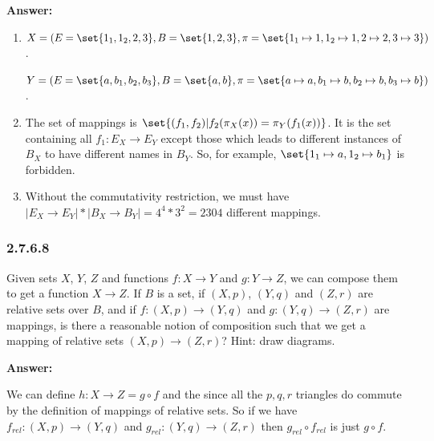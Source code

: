 \documentclass{article}
\newcommand{\vsp}[0]{\vspace*{10pt}\par}
\newcommand{\exercise}[1]{\subsubsection*{#1}}
\newcommand{\ans}[0]{\vsp\textbf{Answer: }\vsp}
\newcommand{\ei}{\item}
\newcommand{\es}{\begin{enumerate}[label=(\alph*)]\ei}
\newcommand{\ee}{\end{enumerate}}
\begin{document}
\ans

\es $X = (E =
    \set{1_1,1_2,2,3}, B = \set{1, 2, 3}, \pi = \set{1_1 \mapsto 1, 1_2
    \mapsto 1, 2 \mapsto 2, 3 \mapsto 3})$.

    $Y = (E = \set{a, b_1, b_2, b_3}, B = \set{a,b}, \pi = \set{a \mapsto a, b_1
    \mapsto b, b_2 \mapsto b, b_3 \mapsto b})$.
\ei The set of mappings is $\set{(f_1, f_2) | f_2(\pi_X(x)) =
    \pi_Y(f_1(x))}$. It is the set containing all $f_1: E_X \to E_Y$ except
    those which leads to different instances of $B_X$ to have different names in
    $B_Y$. So, for example, $\set{1_1 \mapsto a, 1_2 \mapsto b_1}$ is forbidden.
\ei Without the commutativity restriction, we must have $|E_X \to E_Y| * |B_X
    \to B_Y| = 4^4 * 3^2 = 2304$ different mappings.
\ee

\exercise{2.7.6.8}

Given sets $X$, $Y$, $Z$ and functions $f : X \to Y$ and $g: Y \to Z$, we can
compose them to get a function $X \to Z$. If $B$ is a set, if $(X, p)$, $(Y,
q)$ and $(Z, r)$ are relative sets over $B$, and if $f : (X, p) \to (Y, q)$ and
$g: (Y, q) \to (Z, r)$ are mappings, is there a reasonable notion of composition
such that we get a mapping of relative sets $(X, p) \to (Z, r)$? Hint: draw
diagrams.

\ans

\begin{center}
\end{center}

We can define $h : X \to Z = g \circ f$ and the since all the $p,q,r$ triangles
do commute by the definition of mappings of relative sets. So if we have
$f_{rel} : (X,p) \to (Y,q)$ and $g_{rel} : (Y,q) \to (Z,r)$ then $g_{rel} \circ
f_{rel}$ is just $g \circ f$.
\end{document}
